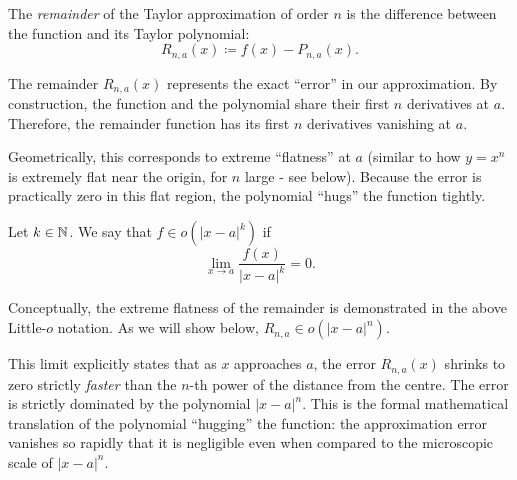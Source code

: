\documentclass[../analysis1.tex]{subfiles}
\begin{document}
\begin{definition}
    \begin{shaded*}
        The \textit{remainder} of the Taylor approximation of order $n$ is the difference between the function and its Taylor polynomial:
        \[
            R_{n,a}(x) \coloneqq f(x) - P_{n,a}(x).
        \]
    \end{shaded*}
\end{definition}

The remainder $R_{n,a}(x)$ represents the exact ``error'' in our approximation. By construction, the function and the polynomial share their first $n$ derivatives at $a$. Therefore, the remainder function has its first $n$ derivatives vanishing at $a$.
    
Geometrically, this corresponds to extreme ``flatness'' at $a$ (similar to how $y=x^{n}$ is extremely flat near the origin, for $n$ large - see below). Because the error is practically zero in this flat region, the polynomial ``hugs'' the function tightly. 

\begin{center}
\end{center}

\begin{definition}
    \begin{shaded*}
        Let $k \in \mathbb{N}$. We say that $f \in o(|x-a|^k)$ if
        \[
            \lim_{x \to a} \frac{f(x)}{|x-a|^k} = 0.
        \]
    \end{shaded*}
\end{definition}

Conceptually, the extreme flatness of the remainder is demonstrated in the above Little-$o$ notation. As we will show below, $R_{n,a} \in o(|x-a|^n)$. 
    
This limit explicitly states that as $x$ approaches $a$, the error $R_{n,a}(x)$ shrinks to zero strictly \textit{faster} than the $n$-th power of the distance from the centre. The error is strictly dominated by the polynomial $|x-a|^n$. This is the formal mathematical translation of the polynomial ``hugging'' the function: the approximation error vanishes so rapidly that it is negligible even when compared to the microscopic scale of $|x-a|^n$.
\end{document}
